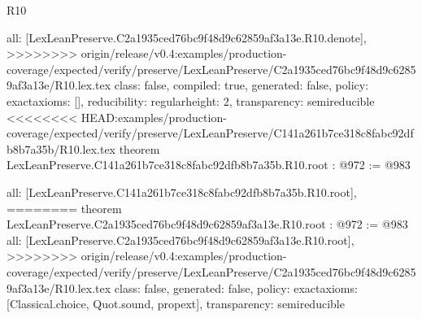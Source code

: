 \begin{lexlean}{R10}
\begin{coremodule}
{{{{{  all: [LexLeanPreserve.C2a1935ced76bc9f48d9c62859af3a13e.R10.denote],
>>>>>>>> origin/release/v0.4:examples/production-coverage/expected/verify/preserve/LexLeanPreserve/C2a1935ced76bc9f48d9c62859af3a13e/R10.lex.tex
  class: false,
  compiled: true,
  generated: false,
  policy: exact{axioms: []},
  reducibility: regular{height: 2},
  transparency: semireducible
}
<<<<<<<< HEAD:examples/production-coverage/expected/verify/preserve/LexLeanPreserve/C141a261b7ce318c8fabc92dfb8b7a35b/R10.lex.tex
theorem LexLeanPreserve.C141a261b7ce318c8fabc92dfb8b7a35b.R10.root : @972 := @983 {
  all: [LexLeanPreserve.C141a261b7ce318c8fabc92dfb8b7a35b.R10.root],
========
theorem LexLeanPreserve.C2a1935ced76bc9f48d9c62859af3a13e.R10.root : @972 := @983 {
  all: [LexLeanPreserve.C2a1935ced76bc9f48d9c62859af3a13e.R10.root],
>>>>>>>> origin/release/v0.4:examples/production-coverage/expected/verify/preserve/LexLeanPreserve/C2a1935ced76bc9f48d9c62859af3a13e/R10.lex.tex
  class: false,
  generated: false,
  policy: exact{axioms: [Classical.choice, Quot.sound, propext]},
  transparency: semireducible
}

}}}}}
\end{coremodule}
\end{lexlean}
